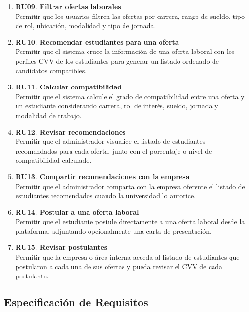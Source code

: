 \documentclass[11pt,a4paper]{Plantilla}
\begin{document}
\begin{enumerate}
    \item \textbf{RU09. Filtrar ofertas laborales} \\
    Permitir que los usuarios filtren las ofertas por carrera, rango de sueldo, tipo de rol, ubicación, modalidad y tipo de jornada.

    \item \textbf{RU10. Recomendar estudiantes para una oferta} \\
    Permitir que el sistema cruce la información de una oferta laboral con los perfiles CVV de los estudiantes para generar un listado ordenado de candidatos compatibles.

    \item \textbf{RU11. Calcular compatibilidad} \\
    Permitir que el sistema calcule el grado de compatibilidad entre una oferta y un estudiante considerando carrera, rol de interés, sueldo, jornada y modalidad de trabajo.

    \item \textbf{RU12. Revisar recomendaciones} \\
    Permitir que el administrador visualice el listado de estudiantes recomendados para cada oferta, junto con el porcentaje o nivel de compatibilidad calculado.

    \item \textbf{RU13. Compartir recomendaciones con la empresa} \\
    Permitir que el administrador comparta con la empresa oferente el listado de estudiantes recomendados cuando la universidad lo autorice.

    \item \textbf{RU14. Postular a una oferta laboral} \\
    Permitir que el estudiante postule directamente a una oferta laboral desde la plataforma, adjuntando opcionalmente una carta de presentación.

    \item \textbf{RU15. Revisar postulantes} \\
    Permitir que la empresa o área interna acceda al listado de estudiantes que postularon a cada una de sus ofertas y pueda revisar el CVV de cada postulante.
\end{enumerate}


\newpage

\subsection{Especificación de Requisitos}
\end{document}
